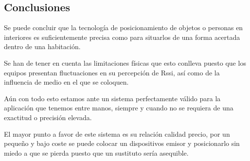 \documentclass[paper=a4, fontsize=11pt,twoside]{scrartcl}
\begin{document}
    \subsection{Conclusiones}
        Se puede concluir que la tecnología de posicionamiento de objetos o personas en interiores es suficientemente precisa como para 
        situarlos de una forma acertada dentro de una habitación.
        
        Se han de tener en cuenta las limitaciones físicas que esto conlleva puesto
        que los equipos presentan fluctuaciones en su percepción de Rssi, así como de la influencia de medio en el que se coloquen.

        Aún con todo esto estamos ante un sistema perfectamente válido para la aplicación que tenemos entre manos, siempre y cuando no se requiera de una
        exactitud o precisión elevada. 

        El mayor punto a favor de este sistema es su relación calidad precio, por un pequeño y bajo coste se puede colocar un dispositivos emisor y posicionarlo 
        sin miedo a que se pierda puesto que un sustituto sería asequible.
\end{document}
